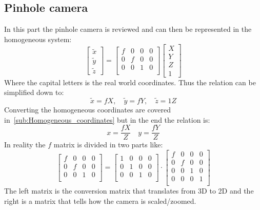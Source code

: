 \subsection{Pinhole camera}%
\label{sub:bg:pinhole_camera}
In this part the pinhole camera is reviewed and can then be represented in the homogeneous system:
\begin{equation}
    \begin{bmatrix}
        \tilde{x}\\\tilde{y} \\ \tilde{z}
    \end{bmatrix}
    =
    \begin{bmatrix}
        f & 0 & 0 & 0\\
        0 & f & 0 & 0\\
        0 & 0 & 1 & 0\\
    \end{bmatrix}
    \begin{bmatrix}
        X\\ Y \\ Z \\ 1
    \end{bmatrix}
\end{equation}
Where the capital letters is the real world coordinates.
Thus the relation can be simplified down to:
\begin{equation}
    \tilde{x} = fX, \quad \tilde{y} = fY, \quad \tilde{z}=1Z
\end{equation}
Converting the homogeneous coordinates are covered in~\ref{sub:Homogeneous_coordinates} but in the end the relation is:
\begin{equation}
    x = \frac{fX}{Z}  \quad y = \frac{fY}{Z}
\end{equation}
In reality the $f$ matrix is divided in two parts like:
\begin{equation}\label{eq:intrinsic_params}
    \begin{bmatrix}
        f & 0 & 0 & 0\\
        0 & f & 0 & 0\\
        0 & 0 & 1 & 0\\
    \end{bmatrix} =
    \begin{bmatrix}
        1 & 0 & 0 & 0\\
        0 & 1 & 0 & 0\\
        0 & 0 & 1 & 0\\
    \end{bmatrix}\cdot
    \begin{bmatrix}
        f & 0 & 0 & 0\\
        0 & f & 0 & 0\\
        0 & 0 & 1 & 0\\
        0 & 0 & 0 & 1\\
    \end{bmatrix}
\end{equation}
The left matrix is the conversion matrix that translates from 3D to 2D and the right is a matrix that tells how the camera is scaled/zoomed.

